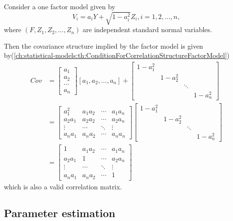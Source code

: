 \begin{refsection}
\begin{example}
	Consider a one factor model given by
$$V_i = a_i Y + \sqrt{1-a_i^2}Z_i, i=1,2,...,n,$$
where $(F,Z_1,Z_2,...,Z_n)$ are independent standard normal variables. 

Then the covariance structure implied by the factor model is given by(\autoref{ch:statistical-models:th:ConditionForCorrelationStructureFactorModel})
\begin{align*}
Cov &= \begin{bmatrix}
a_1\\
a_2\\
\cdots \\
a_n
\end{bmatrix}[a_1, a_2, ..., a_n] + \begin{bmatrix}
1-a_1^2 &  &  & \\ 
& 1-a_2^2 &  & \\ 
&  & \ddots & \\ 
&  &  & 1-a_n^2
\end{bmatrix} \\
&=\begin{bmatrix}
a_1^2 & a_1a_2 & \cdots & a_1a_n\\ 
a_2a_1 & a_2a_2 & \cdots & a_2a_n\\ 
\vdots & \cdots & \ddots & \vdots\\ 
a_na_1 & a_na_2 & \cdots & a_na_n
\end{bmatrix}\begin{bmatrix}
1-a_1^2 &  &  & \\ 
& 1-a_2^2 &  & \\ 
&  & \ddots & \\ 
&  &  & 1-a_n^2
\end{bmatrix}\\
&=\begin{bmatrix}
1 & a_1a_2 & \cdots & a_1a_n\\ 
a_2a_1 & 1 & \cdots & a_2a_n\\ 
\vdots & \cdots & \ddots & \vdots\\ 
a_na_1 & a_na_2 & \cdots & 1
\end{bmatrix}
\end{align*}
which is also a valid correlation matrix.		
\end{example}


\subsection{Parameter estimation}


\end{refsection}
